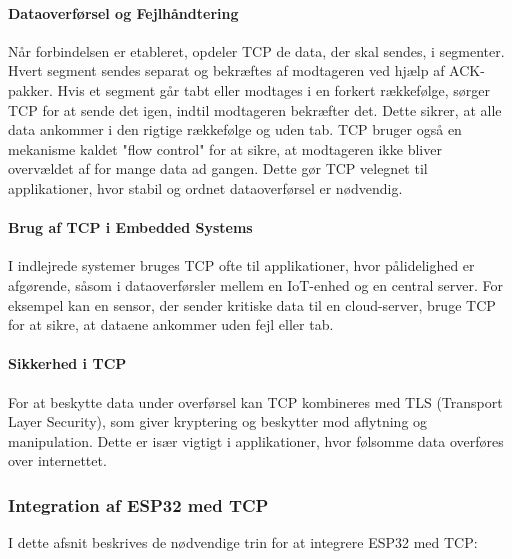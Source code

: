 \documentclass[12pt,a4paper]{book}
\begin{document}
	\paragraph{Dataoverførsel og Fejlhåndtering}
	Når forbindelsen er etableret, opdeler TCP de data, der skal sendes, i segmenter. Hvert segment sendes separat og bekræftes af modtageren ved hjælp af ACK-pakker. Hvis et segment går tabt eller modtages i en forkert rækkefølge, sørger TCP for at sende det igen, indtil modtageren bekræfter det. Dette sikrer, at alle data ankommer i den rigtige rækkefølge og uden tab.
	\newline\newline\noindent
	TCP bruger også en mekanisme kaldet "flow control" for at sikre, at modtageren ikke bliver overvældet af for mange data ad gangen. Dette gør TCP velegnet til applikationer, hvor stabil og ordnet dataoverførsel er nødvendig.
	
	\paragraph{Brug af TCP i Embedded Systems}
	I indlejrede systemer bruges TCP ofte til applikationer, hvor pålidelighed er afgørende, såsom i dataoverførsler mellem en IoT-enhed og en central server. For eksempel kan en sensor, der sender kritiske data til en cloud-server, bruge TCP for at sikre, at dataene ankommer uden fejl eller tab.
	
	\paragraph{Sikkerhed i TCP}
	For at beskytte data under overførsel kan TCP kombineres med TLS (Transport Layer Security), som giver kryptering og beskytter mod aflytning og manipulation. Dette er især vigtigt i applikationer, hvor følsomme data overføres over internettet.
	
	\subsubsection{Integration af ESP32 med TCP}
	I dette afsnit beskrives de nødvendige trin for at integrere ESP32 med TCP:
	
\end{document}
